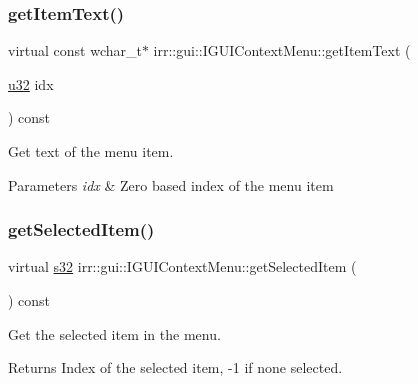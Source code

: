 \subsubsection{\texorpdfstring{get\+Item\+Text()}{getItemText()}}
{\footnotesize\ttfamily virtual const wchar\+\_\+t$\ast$ irr\+::gui\+::\+I\+G\+U\+I\+Context\+Menu\+::get\+Item\+Text (\begin{DoxyParamCaption}\item[{\hyperlink{namespaceirr_a0416a53257075833e7002efd0a18e804}{u32}}]{idx }\end{DoxyParamCaption}) const\hspace{0.3cm}{\ttfamily [pure virtual]}}



Get text of the menu item. 


\begin{DoxyParams}{Parameters}
{\em idx} & Zero based index of the menu item \\
\hline
\end{DoxyParams}
\mbox{\label{classirr_1_1gui_1_1IGUIContextMenu_ae6cd391cf56d4454a855e19feddf8fdc}} 
\subsubsection{\texorpdfstring{get\+Selected\+Item()}{getSelectedItem()}}
{\footnotesize\ttfamily virtual \hyperlink{namespaceirr_ac66849b7a6ed16e30ebede579f9b47c6}{s32} irr\+::gui\+::\+I\+G\+U\+I\+Context\+Menu\+::get\+Selected\+Item (\begin{DoxyParamCaption}{ }\end{DoxyParamCaption}) const\hspace{0.3cm}{\ttfamily [pure virtual]}}



Get the selected item in the menu. 

\begin{DoxyReturn}{Returns}
Index of the selected item, -\/1 if none selected. 
\end{DoxyReturn}
\mbox{\label{classirr_1_1gui_1_1IGUIContextMenu_a296cfd0c4944b2c0bfb88973401fb824}} 
